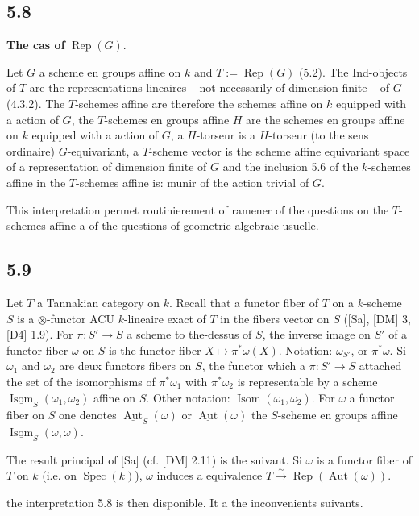 \documentclass[12pt,a4paper]{article}
\theoremstyle{plain}
\theoremstyle{definition}
\theoremstyle{remark}
\DeclareMathOperator{\Aut}{Aut}
\DeclareMathOperator{\Spec}{Spec}
\DeclareMathOperator{\Rep}{Rep}
\DeclareMathOperator{\Isom}{Isom}
\begin{document}
\subsection*{5.8}
\textbf{The cas of} $\Rep(G)$.

Let $G$ a scheme en groups affine on $k$ and $T := 
\Rep(G)$ (5.2). The Ind-objects of $T$ are the representations lineaires -- not necessarily of dimension finite -- of $G$ (4.3.2). The $T$-schemes affine are therefore the schemes affine on $k$ equipped with a action of $G$, the $T$-schemes en groups affine $H$ are the schemes en groups affine on $k$ equipped with a action of $G$, a $H$-torseur is a $H$-torseur (to the sens ordinaire) $G$-equivariant, a $T$-scheme vector is the scheme affine equivariant space of a representation of dimension finite of $G$ and the inclusion 5.6 of the $k$-schemes affine in the $T$-schemes affine is: munir of the action trivial of $G$.

This interpretation permet routinierement of ramener of the questions on the $T$-schemes affine a of the questions of geometrie algebraic usuelle.

\subsection*{5.9}
Let $T$ a Tannakian category on $k$. Recall that a functor fiber of $T$ on a $k$-scheme $S$ is a $\otimes$-functor ACU $k$-lineaire exact of $T$ in the fibers vector on $S$ ([Sa], [DM] 3, [D4] 1.9). For $\pi: S' 
\to S$ a scheme to the-dessus of $S$, the inverse image on $S'$ of a functor fiber $\omega$ on $S$ is the functor fiber $X 
\mapsto 
\pi^*\omega(X)$. Notation: $\omega_{S'}$, or $\pi^*\omega$. Si $\omega_1$ and $\omega_2$ are deux functors fibers on $S$, the functor which a $\pi: S' 
\to S$ attached the set of the isomorphisms of $\pi^*\omega_1$ with $\pi^*\omega_2$ is representable by a scheme $\underline{\Isom}_S(\omega_1,\omega_2)$ affine on $S$. Other notation: $\Isom(\omega_1,\omega_2)$. For $\omega$ a functor fiber on $S$ one denotes $\underline{\Aut}_S(\omega)$ or $\underline{\Aut}(\omega)$ the $S$-scheme en groups affine $\underline{\Isom}_S(\omega,\omega)$.

The result principal of [Sa] (cf. [DM] 2.11) is the suivant. Si $\omega$ is a functor fiber of $T$ on $k$ (i.e. on $\Spec(k)$), $\omega$ induces a equivalence $T 
\xrightarrow{\sim} 
\Rep(\Aut(\omega))$.

the interpretation 5.8 is then disponible. It a the inconvenients suivants.
\end{document}
